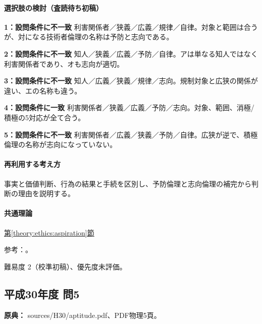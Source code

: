 \paragraph{選択肢の検討（査読待ち初稿）}\mbox{}\par

\noindent\textbf{1：設問条件に不一致} 利害関係者／狭義／広義／規律／自律。対象と範囲は合うが、対になる技術者倫理の名称は予防と志向である。\par

\noindent\textbf{2：設問条件に不一致} 知人／狭義／広義／予防／自律。アは単なる知人ではなく利害関係者であり、オも志向が適切。\par

\noindent\textbf{3：設問条件に不一致} 知人／広義／狭義／規律／志向。規制対象と広狭の関係が違い、エの名称も違う。\par

\noindent\textbf{4：設問条件に一致} 利害関係者／狭義／広義／予防／志向。対象、範囲、消極/積極の5対応が全て合う。\par

\noindent\textbf{5：設問条件に不一致} 利害関係者／広義／狭義／予防／自律。広狭が逆で、積極倫理の名称が志向になっていない。\par

\paragraph{再利用する考え方} 事実と価値判断、行為の結果と手続を区別し、予防倫理と志向倫理の補完から判断の理由を説明する。

\paragraph{共通理論} \hyperref[theory:ethics:aspiration]{第\ref*{theory:ethics:aspiration}節}

\par 参考：\cite{jinji_ethics2017,jinji_ethics_qa,fudano_ethics2021}。

\par 難易度 2（校準初稿）、優先度未評価。

\subsection{平成30年度 問5}
\label{q:h30-reg-apt-05}

\noindent\textbf{原典：} sources/H30/aptitude.pdf、PDF物理5頁。


